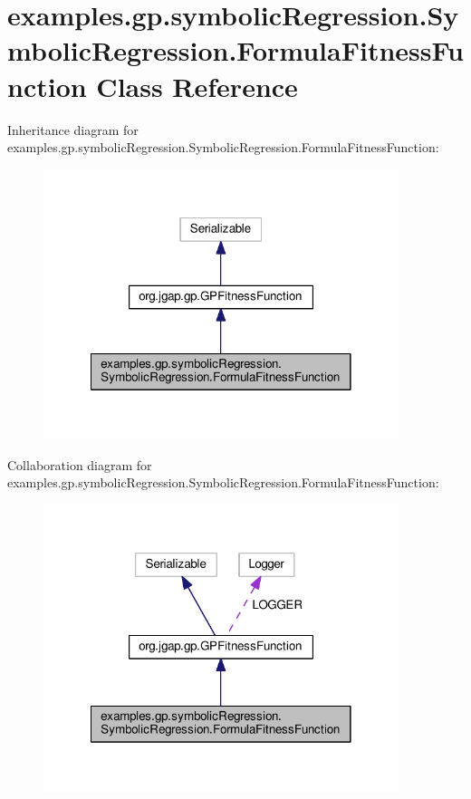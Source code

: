 \hypertarget{classexamples_1_1gp_1_1symbolic_regression_1_1_symbolic_regression_1_1_formula_fitness_function}{\section{examples.\-gp.\-symbolic\-Regression.\-Symbolic\-Regression.\-Formula\-Fitness\-Function Class Reference}
\label{classexamples_1_1gp_1_1symbolic_regression_1_1_symbolic_regression_1_1_formula_fitness_function}
}


Inheritance diagram for examples.\-gp.\-symbolic\-Regression.\-Symbolic\-Regression.\-Formula\-Fitness\-Function\-:
\nopagebreak
\begin{figure}[H]
\begin{center}
\leavevmode
\includegraphics[width=294pt]{classexamples_1_1gp_1_1symbolic_regression_1_1_symbolic_regression_1_1_formula_fitness_function__inherit__graph}
\end{center}
\end{figure}


Collaboration diagram for examples.\-gp.\-symbolic\-Regression.\-Symbolic\-Regression.\-Formula\-Fitness\-Function\-:
\nopagebreak
\begin{figure}[H]
\begin{center}
\leavevmode
\includegraphics[width=294pt]{classexamples_1_1gp_1_1symbolic_regression_1_1_symbolic_regression_1_1_formula_fitness_function__coll__graph}
\end{center}
\end{figure}
